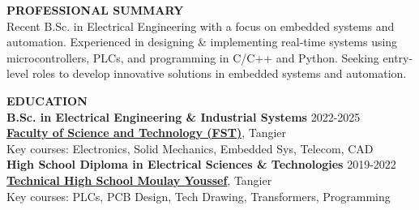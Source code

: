 \documentclass{article}
\begin{document}
\begin{minipage}[t]{0.66\textwidth}
{\color{sectionteal}\large\bfseries PROFESSIONAL SUMMARY} \\[0.05em]
Recent B.Sc. in Electrical Engineering with a focus on embedded systems and automation. Experienced in designing \& implementing real-time systems using microcontrollers, PLCs, and programming in C/C++ and Python. Seeking entry-level roles to develop innovative solutions in embedded systems and automation.

\vspace{1.5em}
{\color{sectionteal}\large\bfseries EDUCATION} \\[0.05em]
\textbf{B.Sc. in Electrical Engineering \& Industrial Systems} \hfill 2022-2025 \\
\href{https://fstt.ac.ma}{\textbf{Faculty of Science and Technology (FST)}}, Tangier \\
Key courses: Electronics, Solid Mechanics, Embedded Sys, Telecom, CAD \\[0.5em]
\textbf{High School Diploma in Electrical Sciences \& Technologies} \hfill 2019-2022 \\
\href{https://fr.wikipedia.org/wiki/Lycée_Moulay-Youssef}{\textbf{Technical High School Moulay Youssef}}, Tangier \\
Key courses: PLCs, PCB Design, Tech Drawing, Transformers, Programming


\end{minipage}
\end{document}
